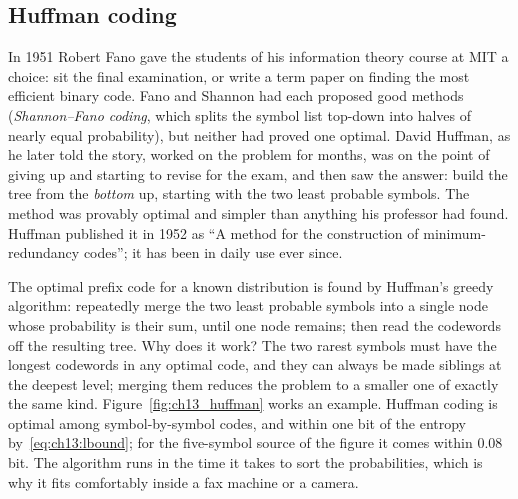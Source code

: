 \subsection{Huffman coding}

\begin{history}
In 1951 Robert Fano gave the students of his information theory course at MIT a choice: sit the
final examination, or write a term paper on finding the most efficient binary code. Fano and
Shannon had each proposed good methods (\emph{Shannon--Fano coding}, which splits the symbol list
top-down into halves of nearly equal probability), but neither had proved one optimal. David
Huffman, as he later told the story, worked on the problem for months, was on the point of giving
up and starting to revise for the exam, and then saw the answer: build the tree from the
\emph{bottom} up, starting with the two least probable symbols. The method was provably optimal and
simpler than anything his professor had found. Huffman published it in 1952 as ``A method for the
construction of minimum-redundancy codes''; it has been in daily use ever since.
\end{history}


The optimal prefix code for a known distribution is found by Huffman's greedy algorithm:
repeatedly merge the two least probable symbols into a single node whose probability is their sum,
until one node remains; then read the codewords off the resulting tree. Why does it work? The two
rarest symbols must have the longest codewords in any optimal code, and they can always be made
siblings at the deepest level; merging them reduces the problem to a smaller one of exactly the
same kind. Figure~\ref{fig:ch13_huffman} works an example. Huffman coding is optimal among
symbol-by-symbol codes, and within one bit of the entropy by~\eqref{eq:ch13:lbound}; for the
five-symbol source of the figure it comes within 0.08\,bit. The algorithm runs in the time it takes
to sort the probabilities, which is why it fits comfortably inside a fax machine or a camera.

